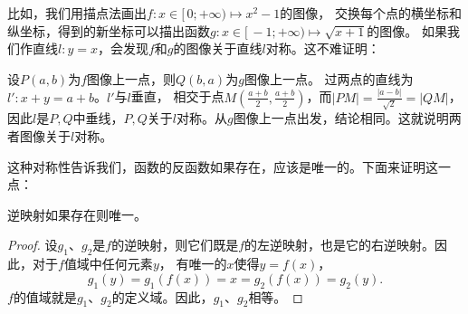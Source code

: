 \documentclass[12pt,UTF8]{ctexbook}
\begin{document}
比如，我们用描点法画出$f: x\in[\,0;+\infty) \mapsto x^2 - 1$的图像，
交换每个点的横坐标和纵坐标，得到的新坐标可以描出函数$g:x\in[\,-1;+\infty)\mapsto\sqrt{x + 1}$的图像。
如果我们作直线$l: y = x$，会发现$f$和$g$的图像关于直线$l$对称。这不难证明：

设$P(a,b)$为$f$图像上一点，则$Q(b,a)$为$g$图像上一点。
过两点的直线为$l':x + y = a + b$。$l'$与$l$垂直，
相交于点$M(\frac{a+b}{2}, \frac{a+b}{2})$，而$|PM| = \frac{|a-b|}{\sqrt{2}} = |QM|$，
因此$l$是$P,Q$中垂线，$P,Q$关于$l$对称。从$g$图像上一点出发，结论相同。这就说明两者图像关于$l$对称。

这种对称性告诉我们，函数的反函数如果存在，应该是唯一的。下面来证明这一点：

\begin{tm}[逆映射的唯一性]
    逆映射如果存在则唯一。
\end{tm}
\begin{proof}
    设$g_1$、$g_2$是$f$的逆映射，则它们既是$f$的左逆映射，也是它的右逆映射。因此，对于$f$值域中任何元素$y$，
    有唯一的$x$使得$y = f(x)$，
    $$ g_1(y) = g_1(f(x)) = x = g_2(f(x)) = g_2(y).$$
    $f$的值域就是$g_1$、$g_2$的定义域。因此，$g_1$、$g_2$相等。
\end{proof}
\end{document}
